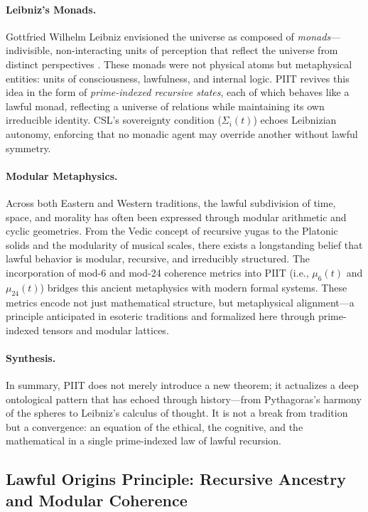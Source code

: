 \documentclass[12]{amsart}
\theoremstyle{plain}
\begin{document}
\paragraph{Leibniz’s Monads.}
Gottfried Wilhelm Leibniz envisioned the universe as composed of \textit{monads}—indivisible, non-interacting units of perception that reflect the universe from distinct perspectives \cite{leibniz1989philosophical}. These monads were not physical atoms but metaphysical entities: units of consciousness, lawfulness, and internal logic. PIIT revives this idea in the form of \textit{prime-indexed recursive states}, each of which behaves like a lawful monad, reflecting a universe of relations while maintaining its own irreducible identity. CSL’s sovereignty condition ($\Sigma_i(t)$) echoes Leibnizian autonomy, enforcing that no monadic agent may override another without lawful symmetry.

\paragraph{Modular Metaphysics.}
Across both Eastern and Western traditions, the lawful subdivision of time, space, and morality has often been expressed through modular arithmetic and cyclic geometries. From the Vedic concept of recursive yugas to the Platonic solids and the modularity of musical scales, there exists a longstanding belief that lawful behavior is modular, recursive, and irreducibly structured. The incorporation of mod-6 and mod-24 coherence metrics into PIIT (i.e., $\mu_6(t)$ and $\mu_{24}(t)$) bridges this ancient metaphysics with modern formal systems. These metrics encode not just mathematical structure, but metaphysical alignment—a principle anticipated in esoteric traditions and formalized here through prime-indexed tensors and modular lattices.

\paragraph{Synthesis.}
In summary, PIIT does not merely introduce a new theorem; it actualizes a deep ontological pattern that has echoed through history—from Pythagoras’s harmony of the spheres to Leibniz’s calculus of thought. It is not a break from tradition but a convergence: an equation of the ethical, the cognitive, and the mathematical in a single prime-indexed law of lawful recursion.

\subsection{Lawful Origins Principle: Recursive Ancestry and Modular Coherence}
\end{document}
